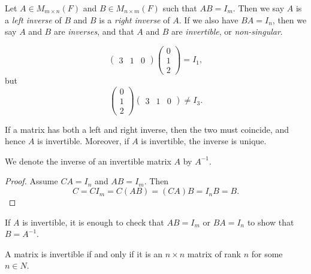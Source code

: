 \begin{defn}
    Let $A \in M_{m \times n}(F)$ and $B \in M_{n \times m}(F)$ such that $AB = I_m$. Then we say $A$ is a \emph{left inverse} of $B$ and $B$ is a \emph{right inverse} of $A$. If we also have $BA = I_n$, then we say $A$ and $B$ are \emph{inverses}, and that $A$ and $B$ are \emph{invertible}, or \emph{non-singular}.
\end{defn}

\begin{exmp}
    \[\begin{pmatrix}
        3 & 1 & 0
    \end{pmatrix}\begin{pmatrix}
        0 \\ 1 \\ 2
    \end{pmatrix} = I_1,\]
    but
    \[\begin{pmatrix}
        0 \\ 1 \\ 2
    \end{pmatrix}\begin{pmatrix}
        3 & 1 & 0
    \end{pmatrix} \neq I_3.\]
\end{exmp}

\begin{lemma}\label{matrix-inverse-unique}
    If a matrix has both a left and right inverse, then the two must coincide, and hence $A$ is invertible. Moreover, if $A$ is invertible, the inverse is unique.
\end{lemma}

\begin{defn}
    We denote the inverse of an invertible matrix $A$ by $A^{-1}$.
\end{defn}

\begin{proof}
    Assume $CA = I_n$ and $AB = I_m$. Then
    \[C = CI_m = C(AB) = (CA)B = I_nB = B.\]
\end{proof}

\begin{rmk}
    If $A$ is invertible, it is enough to check that $AB = I_m$ or $BA = I_n$ to show that $B = A^{-1}$.
\end{rmk}

\begin{thm}\label{matrix-invertible-rank}
    A matrix is invertible if and only if it is an $n \times n$ matrix of rank $n$ for some $n \in N$.
\end{thm}

